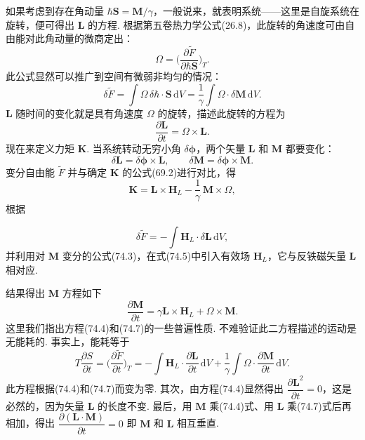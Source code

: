 如果考虑到存在角动量 $\hbar\bm{S}=\bm{M}/\gamma$，一般说来，就表明系统——这里是自旋系统在旋转，便可得出 $\bm{L}$ 的方程. 根据第五卷热力学公式(26.8)，此旋转的角速度可由自由能对此角动量的微商定出：
\begin{equation*}
\bm{\varOmega}=\biggl(\frac{\partial\tilde{F}}{\partial\hbar\bm{S}}\biggr)_{\!T}.
\end{equation*}
此公式显然可以推广到空间有微弱非均匀的情况：
\begin{equation}
\delta\tilde{F}=\int\bm{\varOmega}\,\delta\hbar\cdot\bm{S}\,\mathrm{d}V
=\frac{1}{\gamma}\int\bm{\varOmega}\cdot\delta\bm{M}\,\mathrm{d}V.
\end{equation}
$\bm{L}$ 随时间的变化就是具有角速度 $\bm{\varOmega}$ 的旋转，描述此旋转的方程为
\begin{equation}
\frac{\partial\bm{L}}{\partial t}=\bm{\varOmega}\times\bm{L}.
\end{equation}
现在来定义力矩 $\bm{K}$. 当系统转动无穷小角 $\delta\bm{\phi}$，两个矢量 $\bm{L}$ 和 $\bm{M}$ 都要变化：
\begin{equation*}
\delta\bm{L}=\delta\bm{\phi}\times\bm{L},\qquad
\delta\bm{M}=\delta\bm{\phi}\times\bm{M}.
\end{equation*}
变分自由能 $\tilde{F}$ 并与确定 $\bm{K}$ 的公式(69.2)进行对比，得
\begin{equation}
\bm{K}=\bm{L}\times\bm{H}_L-\frac{1}{\gamma}\,\bm{M}\times\bm{\varOmega},
\end{equation}
根据

\begin{equation}
\delta\tilde{F}=-\int\bm{H}_L\cdot\delta\bm{L}\,\mathrm{d}V,
\end{equation}
并利用对 $\bm{M}$ 变分的公式(74.3)，在式(74.5)中引入有效场 $\bm{H}_L$，它与反铁磁矢量 $\bm{L}$ 相对应.

结果得出 $\bm{M}$ 方程如下
\begin{equation}
\frac{\partial\bm{M}}{\partial t}=\gamma\bm{L}\times\bm{H}_L+\bm{\varOmega}\times\bm{M}.
\end{equation}
这里我们指出方程(74.4)和(74.7)的一些普遍性质. 不难验证此二方程描述的运动是无能耗的. 事实上，能耗等于
\begin{equation*}
T\frac{\partial S}{\partial t}=\biggl(\frac{\partial\tilde{F}}{\partial t}\biggr)_{\!T}
=-\int\bm{H}_L\cdot\frac{\partial\bm{L}}{\partial t}\,\mathrm{d}V
+\frac{1}{\gamma}\int\bm{\varOmega}\cdot\frac{\partial\bm{M}}{\partial t}\,\mathrm{d}V.
\end{equation*}
此方程根据(74.4)和(74.7)而变为零. 其次，由方程(74.4)显然得出 $\dfrac{\partial\bm{L}^2}{\partial t}=0$，这是必然的，因为矢量 $\bm{L}$ 的长度不变. 最后，用 $\bm{M}$ 乘(74.4)式、用 $\bm{L}$ 乘(74.7)式后再相加，得出 $\dfrac{\partial(\bm{L}\cdot\bm{M})}{\partial t}=0$ 即 $\bm{M}$ 和 $\bm{L}$ 相互垂直.

